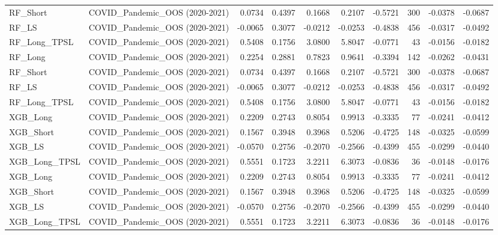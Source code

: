 \begin{tabular}{llrrrrrrrr}
\cline{1-10}
RF\_Short & COVID\_Pandemic\_OOS (2020-2021) & 0.0734 & 0.4397 & 0.1668 & 0.2107 & -0.5721 & 300 & -0.0378 & -0.0687 \\
\cline{1-10}
RF\_LS & COVID\_Pandemic\_OOS (2020-2021) & -0.0065 & 0.3077 & -0.0212 & -0.0253 & -0.4838 & 456 & -0.0317 & -0.0492 \\
\cline{1-10}
RF\_Long\_TPSL & COVID\_Pandemic\_OOS (2020-2021) & 0.5408 & 0.1756 & 3.0800 & 5.8047 & -0.0771 & 43 & -0.0156 & -0.0182 \\
\cline{1-10}
RF\_Long & COVID\_Pandemic\_OOS (2020-2021) & 0.2254 & 0.2881 & 0.7823 & 0.9641 & -0.3394 & 142 & -0.0262 & -0.0431 \\
\cline{1-10}
RF\_Short & COVID\_Pandemic\_OOS (2020-2021) & 0.0734 & 0.4397 & 0.1668 & 0.2107 & -0.5721 & 300 & -0.0378 & -0.0687 \\
\cline{1-10}
RF\_LS & COVID\_Pandemic\_OOS (2020-2021) & -0.0065 & 0.3077 & -0.0212 & -0.0253 & -0.4838 & 456 & -0.0317 & -0.0492 \\
\cline{1-10}
RF\_Long\_TPSL & COVID\_Pandemic\_OOS (2020-2021) & 0.5408 & 0.1756 & 3.0800 & 5.8047 & -0.0771 & 43 & -0.0156 & -0.0182 \\
\cline{1-10}
XGB\_Long & COVID\_Pandemic\_OOS (2020-2021) & 0.2209 & 0.2743 & 0.8054 & 0.9913 & -0.3335 & 77 & -0.0241 & -0.0412 \\
\cline{1-10}
XGB\_Short & COVID\_Pandemic\_OOS (2020-2021) & 0.1567 & 0.3948 & 0.3968 & 0.5206 & -0.4725 & 148 & -0.0325 & -0.0599 \\
\cline{1-10}
XGB\_LS & COVID\_Pandemic\_OOS (2020-2021) & -0.0570 & 0.2756 & -0.2070 & -0.2566 & -0.4399 & 455 & -0.0299 & -0.0440 \\
\cline{1-10}
XGB\_Long\_TPSL & COVID\_Pandemic\_OOS (2020-2021) & 0.5551 & 0.1723 & 3.2211 & 6.3073 & -0.0836 & 36 & -0.0148 & -0.0176 \\
\cline{1-10}
XGB\_Long & COVID\_Pandemic\_OOS (2020-2021) & 0.2209 & 0.2743 & 0.8054 & 0.9913 & -0.3335 & 77 & -0.0241 & -0.0412 \\
\cline{1-10}
XGB\_Short & COVID\_Pandemic\_OOS (2020-2021) & 0.1567 & 0.3948 & 0.3968 & 0.5206 & -0.4725 & 148 & -0.0325 & -0.0599 \\
\cline{1-10}
XGB\_LS & COVID\_Pandemic\_OOS (2020-2021) & -0.0570 & 0.2756 & -0.2070 & -0.2566 & -0.4399 & 455 & -0.0299 & -0.0440 \\
\cline{1-10}
XGB\_Long\_TPSL & COVID\_Pandemic\_OOS (2020-2021) & 0.5551 & 0.1723 & 3.2211 & 6.3073 & -0.0836 & 36 & -0.0148 & -0.0176 \\

\end{tabular}
